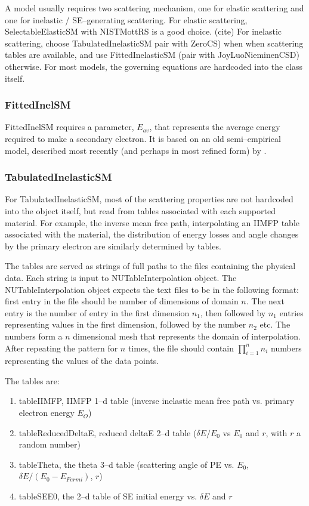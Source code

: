 A model usually requires two scattering mechanism, one for elastic scattering and one for inelastic / SE--generating scattering. For elastic scattering, SelectableElasticSM with NISTMottRS is a good choice. (cite) For inelastic scattering, choose TabulatedInelasticSM pair with ZeroCS) when when scattering tables are available, and use FittedInelasticSM (pair with JoyLuoNieminenCSD) otherwise. For most models, the governing equations are hardcoded into the class itself. 

\subsubsection{FittedInelSM}
FittedInelSM requires a parameter, $E_{av}$, that represents the average energy required to make a secondary electron. It is based on an old semi--empirical model, described most recently (and perhaps in most refined form) by \cite{lin2005new}.

\subsubsection{TabulatedInelasticSM}
For TabulatedInelasticSM, most of the scattering properties are not hardcoded into the object itself, but read from tables associated with each supported material. For example, the inverse mean free path, interpolating an IIMFP table associated with the material, the distribution of energy losses and angle changes by the primary electron are similarly determined by tables. 

The tables are served as strings of full paths to the files containing the physical data. Each string is input to NUTableInterpolation object. The NUTableInterpolation object expects the text files to be in the following format: first entry in the file should be number of dimensions of domain $n$. The next entry is the number of entry in the first dimension $n_1$, then followed by $n_1$ entries representing values in the first dimension, followed by the number $n_2$ etc. The numbers form a $n$ dimensional mesh that represents the domain of interpolation. After repeating the pattern for $n$ times, the file should contain $\prod_{i=1}^{n}n_i$ numbers representing the values of the data points. 

The tables are:
\begin{enumerate}
    \item tableIIMFP, IIMFP 1--d table (inverse inelastic mean free path vs. primary electron energy $E_O$)
    \item tableReducedDeltaE, reduced deltaE 2--d table ($\delta E/E_0$ vs $E_0$ and $r$, with $r$ a random number)
    \item tableTheta, the theta 3--d table (scattering angle of PE vs. $E_0$, $\delta E/(E_0-E_{Fermi})$, $r$)
    \item tableSEE0, the 2--d table of SE initial energy vs. $\delta E$ and $r$
\end{enumerate}

